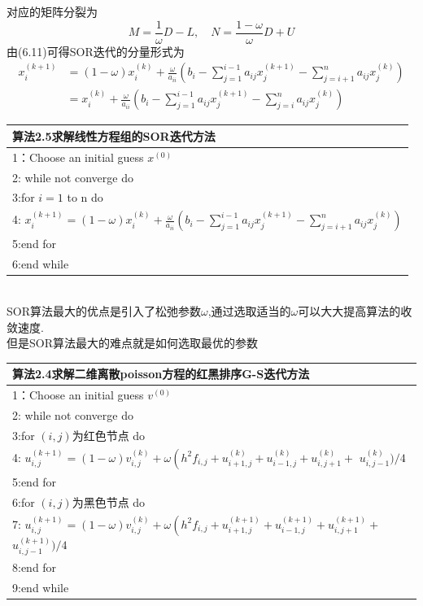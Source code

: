 \documentclass[12pt,a4paper]{article}
\begin{document}
对应的矩阵分裂为
$$
M=\frac{1}{\omega} D-L, \quad N=\frac{1-\omega}{\omega} D+U
$$
由({\color{blue}6.11})可得SOR迭代的分量形式为
$$
\begin{aligned} x_{i}^{(k+1)} &=(1-\omega) x_{i}^{(k)}+\frac{\omega}{a_{i i}}\left(b_{i}-\sum_{j=1}^{i-1} a_{i j} x_{j}^{(k+1)}-\sum_{j=i+1}^{n} a_{i j} x_{j}^{(k)}\right) \\ &=x_{i}^{(k)}+\frac{\omega}{a_{i i}}\left(b_{i}-\sum_{j=1}^{i-1} a_{i j} x_{j}^{(k+1)}-\sum_{j=i}^{n} a_{i j} x_{j}^{(k)}\right) \end{aligned}
$$
\begin{tabular}{l}
\hline
{\color{blue}算法2.5}求解线性方程组的SOR迭代方法\\
\hline
1：Choose an initial guess $x^{(0)}$\\
2: while not converge do\\
3:\qquad for $i=1$ to n do\\
4:\qquad \qquad
$x_{i}^{(k+1)}=(1-\omega) x_{i}^{(k)}+\frac{\omega}{a_{i i}}\left(b_{i}-\sum_{j=1}^{i-1} a_{i j} x_{j}^{(k+1)}-\sum_{j=i+1}^{n} a_{i j} x_{j}^{(k)}\right)$\\
5:\qquad end for\\
6:end while\\
\hline
\end{tabular}\\
SOR算法最大的优点是引入了松弛参数$\omega$,通过选取适当的$\omega$可以大大提高算法的收敛速度.\\
但是SOR算法最大的难点就是如何选取最优的参数\\
\begin{tabular}{l}
\hline
{\color{blue}算法2.4}求解二维离散poisson方程的红黑排序G-S迭代方法\\
\hline
1：Choose an initial guess $v^{(0)}$\\
2: while not converge do\\
3:\qquad for $(i,j)$为红色节点 do\\
4:\qquad \qquad
$u_{i, j}^{(k+1)}=(1-\omega) v_{i, j}^{(k)}+\omega\left(h^{2} f_{i, j}+u_{i+1, j}^{(k)}+u_{i-1, j}^{(k)}+u_{i, j+1}^{(k)}+\right.$
$u_{i, j-1}^{(k)} ) / 4$\\
5:\qquad end for\\
6:\qquad for $(i,j)$为黑色节点 do\\
7:\qquad \qquad
$u_{i, j}^{(k+1)}=(1-\omega) v_{i, j}^{(k)}+\omega\left(h^{2} f_{i, j}+u_{i+1, j}^{(k+1)}+u_{i-1, j}^{(k+1)}+u_{i, j+1}^{(k+1)}+\right.$
$u_{i, j-1}^{(k+1)} ) / 4$\\
8:\qquad end for\\
9:end while\\
\hline
\end{tabular}\\
\end{document}
